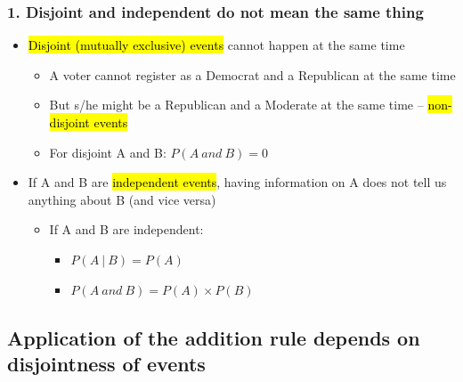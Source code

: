\documentclass[slidestop,compress,mathserif,12pt,t,professionalfonts,xcolor=table]{beamer}
\begin{document}

\begin{frame}
\frametitle{1. Disjoint and independent do not mean the same thing}

\begin{itemize}

\item \hl{Disjoint (mutually exclusive) events} cannot happen at the same time
\begin{itemize}
\item A voter cannot register as a Democrat and a Republican at the same time
\item But s/he might be a Republican and a Moderate at the same time -- \hl{non-disjoint events}
\item For disjoint A and B: $P(A~and~B) = 0$
\end{itemize}

\pause

\item If A and B are \hl{independent events}, having information on A does not tell us anything about B (and vice versa)
\begin{itemize}
\item If A and B are independent: 
\begin{itemize}
\item $P(A~|~B) = P(A)$
\item $P(A~and~B) = P(A) \times P(B)$
\end{itemize}
\end{itemize}

\end{itemize}

\end{frame}


\subsection{Application of the addition rule depends on disjointness of events}
\label{mi2}

\end{document}
